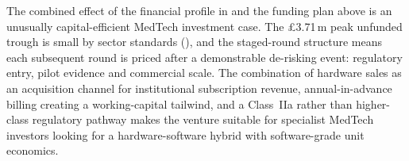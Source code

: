 The combined effect of the financial profile in  and the funding plan above is an unusually capital-efficient MedTech investment case. The \pounds3.71\,m peak unfunded trough is small by sector standards (), and the staged-round structure means each subsequent round is priced after a demonstrable de-risking event: regulatory entry, pilot evidence and commercial scale. The combination of hardware sales as an acquisition channel for institutional subscription revenue, annual-in-advance billing creating a working-capital tailwind, and a Class~IIa rather than higher-class regulatory pathway makes the venture suitable for specialist MedTech investors looking for a hardware-software hybrid with software-grade unit economics.
